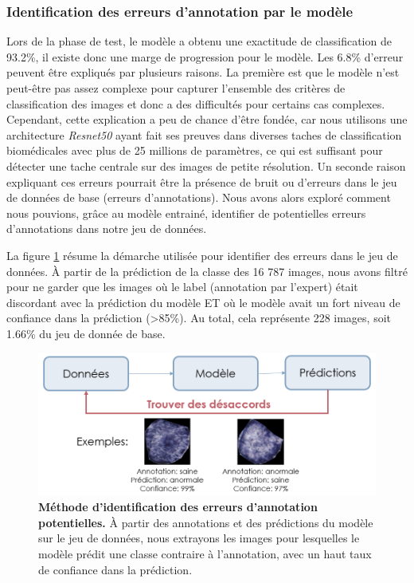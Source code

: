 \subsubsection{Identification des erreurs d'annotation par le modèle}
Lors de la phase de test, le modèle a obtenu une exactitude de classification de 93.2\%, il existe donc une marge de progression pour le modèle. Les 6.8\% d'erreur peuvent être expliqués par plusieurs raisons. La première est que le modèle n'est peut-être pas assez complexe pour capturer l'ensemble des critères de classification des images et donc a des difficultés pour certains cas complexes. Cependant, cette explication a peu de chance d'être fondée, car nous utilisons une architecture \textit{Resnet50} ayant fait ses preuves dans diverses taches de classification biomédicales avec plus de 25 millions de paramètres, ce qui est suffisant pour détecter une tache centrale sur des images de petite résolution. Un seconde raison expliquant ces erreurs pourrait être la présence de bruit ou d'erreurs dans le jeu de données de base (erreurs d'annotations). Nous avons alors exploré comment nous pouvions, grâce au modèle entrainé, identifier de potentielles erreurs d'annotations dans notre jeu de données.

La figure \ref{fig:identify_errors} résume la démarche utilisée pour identifier des erreurs dans le jeu de données. À partir de la prédiction de la classe des 16 787 images, nous avons filtré pour ne garder que les images où le label (annotation par l'expert) était discordant avec la prédiction du modèle ET où le modèle avait un fort niveau de confiance dans la prédiction (>85\%). Au total, cela représente 228 images, soit 1.66\% du jeu de donnée de base.
\begin{figure}[!ht]
 \centering
 \includegraphics[width=1\textwidth]{figures/identify_errors.png}
 \caption[Méthode d'identification des potentielles erreurs d'annotation]{\textbf{Méthode d'identification des erreurs d'annotation potentielles.} À partir des annotations et des prédictions du modèle sur le jeu de données, nous extrayons les images pour lesquelles le modèle prédit une classe contraire à l'annotation, avec un haut taux de confiance dans la prédiction.}
 \label{fig:identify_errors}
\end{figure}

